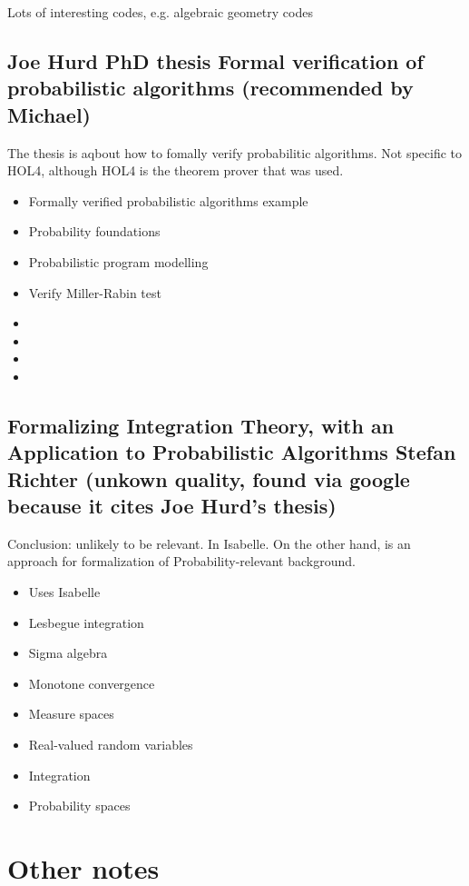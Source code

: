 \documentclass{article}
\begin{document}
Lots of interesting codes, e.g. algebraic geometry codes

\subsection {Joe Hurd PhD thesis Formal verification of probabilistic
algorithms (recommended by Michael)}

The thesis is aqbout how to fomally verify probabilitic algorithms. Not specific to HOL4, although HOL4 is the theorem prover that was used.

\begin{itemize}
\item {Formally verified probabilistic algorithms example}
\item {Probability foundations}
\item {Probabilistic program modelling}
\item {Verify Miller-Rabin test}
\item {}
\item {}
\item {}
\item {}
\end{itemize}


\subsection{Formalizing Integration Theory, with an
Application to Probabilistic Algorithms
Stefan Richter 
(unkown quality, found via google because it cites Joe Hurd's thesis)}

Conclusion: unlikely to be relevant. In Isabelle. On the other hand, is an approach for formalization of Probability-relevant background.

\begin{itemize}
\item {Uses Isabelle}
\item {Lesbegue integration}
\item {Sigma algebra}
\item {Monotone convergence}
\item {Measure spaces}
\item {Real-valued random variables}
\item {Integration}
\item{Probability spaces}
\end{itemize}

\section{Other notes}
\end{document}
